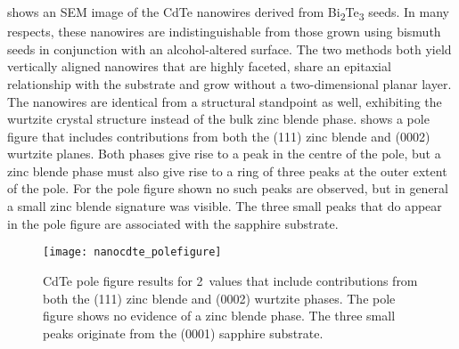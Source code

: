  shows an SEM image of the CdTe nanowires
derived from Bi\textsubscript{2}Te\textsubscript{3} seeds. In many respects, these nanowires
are indistinguishable from those grown using bismuth seeds
in conjunction with an alcohol-altered surface\cite{Neretina2007b}. The two
methods both yield vertically aligned nanowires that are highly
faceted, share an epitaxial relationship with the substrate and
grow without a two-dimensional planar layer. The nanowires
are identical from a structural standpoint as well, exhibiting
the wurtzite crystal structure instead of the bulk zinc blende phase. 
shows a pole figure that includes contributions from both
the (111) zinc blende and (0002) wurtzite planes. Both phases give rise to a peak in the
centre of the pole, but a zinc blende phase must also give rise to
a ring of three peaks at the outer extent of the pole. For the pole
figure shown no such peaks are observed, but in general a small
zinc blende signature was visible. The three small peaks that
do appear in the pole figure are associated with the sapphire
substrate.
\begin{figure}
    \centering
    \texttt{[image: nanocdte\_polefigure]}
    \caption{\label{fig:nanocdte_polefigure}CdTe pole figure results for 2\straighttheta~values that include contributions from both the (111) zinc blende and (0002) wurtzite phases. The pole figure shows no evidence of a zinc blende phase. The three small peaks originate from the (0001) sapphire substrate.}
\end{figure}

